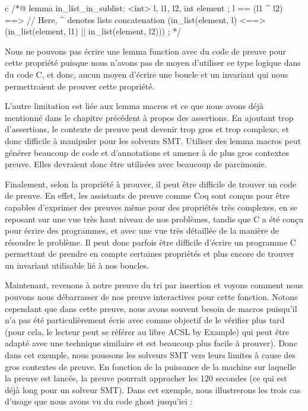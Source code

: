 \begin{CodeBlock}{c}
/*@
  lemma in_list_in_sublist:
    \forall \list<int> l, l1, l2, int element ;
      l == (l1 ^ l2) ==>      // Here, ^ denotes lists concatenation
      (in_list(element, l) <==> (in_list(element, l1) || in_list(element, l2))) ;
*/
\end{CodeBlock}


Nous ne pouvons pas écrire une lemma function avec du code de preuve pour cette
propriété puisque nous n'avons pas de moyen d'utiliser ce type logique dans du
code C, et donc, aucun moyen d'écrire une boucle et un invariant qui nous 
permettraient de prouver cette propriété.


L'autre limitation est liée aux lemma macros et ce que nous avons déjà mentionné
dans le chapitre précédent à propos des assertions. En ajoutant trop d'assertions,
le contexte de preuve peut devenir trop gros et trop complexe, et donc difficile à
manipuler pour les solveurs SMT. Utiliser des lemma macros peut générer beaucoup
de code et d'annotations et amener à de plus gros contextes preuve. Elles devraient
donc être utilisées avec beaucoup de parcimonie.


Finalement, selon la propriété à prouver, il peut être difficile de trouver un
code de preuve. En effet, les assistants de preuve comme Coq sont conçus pour
être capables d'exprimer des preuves même pour des propriétés très complexes,
en se reposant sur une vue très haut niveau de nos problèmes, tandis que C a été
conçu pour écrire des programmes, et avec une vue très détaillée de la manière de
résoudre le problème. Il peut donc parfois être difficile d'écrire un programme
C permettant de prendre en compte certaines propriétés et plus encore de trouver
un invariant utilisable lié à nos boucles.




Maintenant, revenons à notre preuve du tri par insertion et voyons comment nous
pouvons nous débarrasser de nos preuve interactives pour cette fonction. Notons
cependant que dans cette preuve, nous avons souvent besoin de macros puisqu'il
n'a pas été particulièrement écris avec comme objectif de le vérifier plus tard
(pour cela, le lecteur peut se référer au libre ACSL by Example) qui peut être
adapté avec une technique similaire et est beaucoup plus facile à prouver). Donc
dans cet exemple, nous poussons les solveurs SMT vers leurs limites à cause des
gros contextes de preuve. En fonction de la puissance de la machine sur laquelle
la preuve est lancée, la preuve pourrait approcher les 120 secondes (ce qui est
déjà long pour un solveur SMT). Dans cet exemple, nous illustrerons les trois
cas d'usage que nous avons vu du code ghost jusqu'ici :


